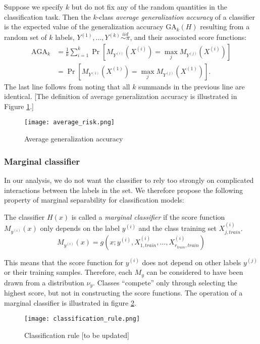 \documentclass[twoside,11pt]{article}
\begin{document}
Suppose we specify $k$ but do not fix any of the random quantities in the
classification task.  Then the $k$-class \emph{average generalization accuracy} of
a classifier is the expected value of the generalization accuracy $\text{GA}_k(H)$ resulting from a random set of $k$ labels, $Y^{(1)}, \hdots, Y^{(k)} \stackrel{iid}{\sim \pi}$, and their associated score functions:
\begin{align*}
\text{AGA}_k &= \frac{1}{k} \sum_{i=1}^k \Pr[M_{Y^{(i)}}(X^{(i)}) = \max_j
M_{Y^{(j)}}(X^{(i)})]
\\&= \Pr[M_{Y^{(1)}}(X^{(1)}) = \max_j M_{Y^{(j)}}(X^{(1)})].
\end{align*}
The last line follows from noting that all $k$ summands in the previous line are identical.
[The definition of average generalization accuracy is illustrated in Figure \ref{fig:average_risk}.]

\begin{figure}[h]
\centering
\texttt{[image: average\_risk.png]}
\caption{Average generalization accuracy}\label{fig:average_risk}
\end{figure}

\subsubsection{Marginal classifier}

In our analysis, we do not
want the classifier to rely too strongly on complicated interactions
between the labels in the set. We therefore propose the following
property of marginal separability for classification models:

\begin{definition}
The classifier $H(x)$ is called a \emph{marginal classifier} if the score 
function $M_{y^{(i)}}(x)$
only depends on the label $y^{(i)}$ and the class training set $X_{j, train}^{(i)}$.
\[M_{y^{(i)}}(x) = g(x; y^{(i)},X_{1, train}^{(i)},...,X_{r_{train}, train}^{(i)})\]
\end{definition}
This means that the score function for $y^{(i)}$ does not depend on other labels $y^{(j)}$ or their training 
samples.  Therefore, each $M_y$ can be considered to have been drawn from a distribution $\nu_y$.
Classes ``compete'' only through selecting the highest score, 
but not in constructing the score functions. 
The operation of a marginal classifier is illustrated in figure
\ref{fig:classification_rule}.


\begin{figure}[h]
\centering
\texttt{[image: classification\_rule.png]}
\caption{Classification rule [to be updated]}\label{fig:classification_rule}
\end{figure}
\end{document}
